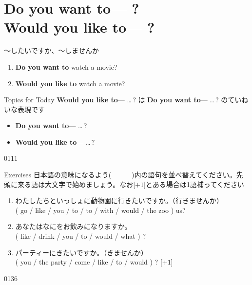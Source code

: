 \documentclass[aspectratio=169,xcolor={dvipsnames,table}]{beamer}
\begin{document}
\section{Do you want to--- ?\\Would you like to--- ?}
\begin{frame}[plain]{～したいですか、～しませんか}
\large
 \begin{enumerate}
  \item \textbf{Do you want to} watch a movie?
  \item \textbf{Would you like to} watch a movie?
 \end{enumerate}

\begin{block}{Topics for Today}\small
\textbf{Would you like to}---\,\,\ldots\,?\,\,は\,\,\textbf{Do you want to}---\,\,\ldots\,?\,\,のていねいな表現です
\begin{itemize}[square]\small
 \item \textbf{Do you want to}--- \ldots\,?
 \item \textbf{Would you like to}--- \ldots\,?
       \end{itemize}
\end{block}
\hfill{\tiny 0111}\,{\scriptsize {}}

\end{frame}
\begin{frame}[plain]{Exercises}
日本語の意味になるよう(~~~~~~)内の語句を並べ替えてください。先頭に来る語は大文字で始めましょう。なお[$+1$]とある場合は1語補ってください

 \begin{enumerate}
  \item わたしたちといっしょに動物園に行きたいですか。（行きませんか）\\
( go / like / you / to / to / with / would / the zoo ) us?\\
  \item あなたはなにをお飲みになりますか。\\
( like / drink / you / to / would / what ) ?\\
  \item パーティーにきたいですか。（きませんか）\\
( you / the party / come / like / to / would ) ? [$+1$]\\
 
\end{enumerate}
\hfill{\tiny 0136}\,{\scriptsize {}}

\end{frame}
\end{document}
